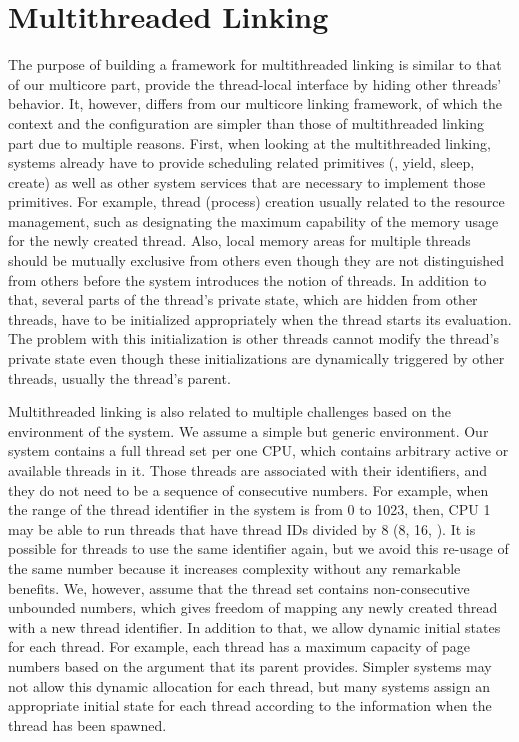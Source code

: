 \section{Multithreaded Linking}
\label{chapter:linking:sec:multithreaded-linking}


The purpose of building a framework for multithreaded linking is similar to  that of our multicore part,
provide the thread-local interface by hiding other threads' behavior. 
It, however, differs from our multicore linking framework, of which the  context and the configuration 
are simpler than those of multithreaded linking part due to multiple reasons.
First, when looking at the multithreaded linking, 
systems already have to provide 
scheduling related primitives (\ie, yield, sleep, create)
as well as other system services 
that are necessary to implement those primitives. 
For example, 
thread (process) creation usually related to the 
resource management,
such as designating the maximum capability of the memory usage 
for the newly created thread. 
Also, 
local memory areas for multiple threads should be 
mutually exclusive from others even though 
they are not distinguished from others before the system introduces the notion of threads.
In addition to that, 
several parts of the thread's private state,
which are hidden from other threads,
have to be initialized appropriately when the thread starts its evaluation.
The problem with this initialization is other threads cannot modify the thread's private state even though these initializations are dynamically triggered by
other threads, usually the thread's parent. 

Multithreaded linking is also related to 
multiple challenges based on the environment of the system.
We assume a simple but generic environment. 
Our system contains a full thread set per one CPU,
which contains arbitrary active or available threads in it.
Those threads are associated with their identifiers, and they do not need to be a sequence of consecutive numbers.
For example, when the range of
the thread identifier in the system is from 0 to 1023, 
then, CPU 1 may be able to run threads that have thread IDs divided by 8 (8, 16, \etc). 
It is possible for threads to use the same identifier again, but we avoid this re-usage of the same number because it increases complexity without any remarkable benefits. 
We, however, assume that the thread set contains non-consecutive unbounded numbers,
which gives freedom of mapping any newly created thread with a new thread identifier. 
In addition to that, 
we allow dynamic initial states for each thread. 
For example, each thread has a maximum capacity of page numbers based on the argument that its parent 
provides.
Simpler systems may not allow this dynamic allocation for each thread,
but many systems assign an appropriate initial state for each thread 
according to the information when the thread has been spawned.

